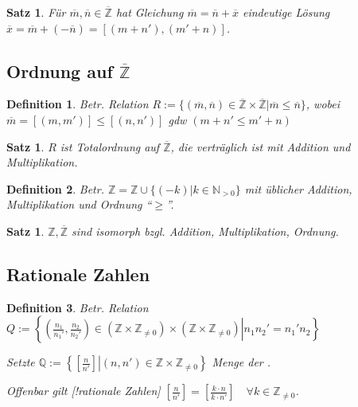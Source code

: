 \documentclass[ngerman,a4paper]{report}
\theoremstyle{break}
\newtheorem{satz}[theorem]{Satz}
\newtheorem*{definition}{Definition}
\begin{document}
\begin{satz}
	Für $\overline{m},\overline{n}\in\overline{\mathbb{Z}}$ hat Gleichung $\overline{m} = \overline{n} + \overline{x}$ eindeutige Lösung $\overline{x} = \overline{m} + (-\overline{n}) = [(m+n'),(m'+n)]$.
\end{satz}

\subsection*{Ordnung auf $\overline{\mathbb{Z}}$}
\begin{definition}
	Betr. Relation $R:=\{(\overline{m},\overline{n})\in\overline{\mathbb{Z}}\times\overline{\mathbb{Z}} | \overline{m} \le \overline{n}\}$, wobei $\overline{m} = [(m,m')] \le [(n,n')]$ \gls{gdw} $(m+n'\le m'+n)$
\end{definition}

\begin{satz}
	$R$ ist Totalordnung auf $\overline{\mathbb{Z}}$, die verträglich ist mit Addition und Multiplikation.
\end{satz}

\begin{definition}
	Betr. $\mathbb{Z} = \mathbb{Z}\cup\{ (-k) | k\in\mathbb{N}_{>0} \}$ mit üblicher Addition, Multiplikation und Ordnung "`$\ge$"'.
\end{definition}
\begin{satz}
	$\mathbb{Z},\overline{\mathbb{Z}}$ sind isomorph bzgl. Addition, Multiplikation, Ordnung.
\end{satz}

\subsection*{Rationale Zahlen}
\begin{definition}
	Betr. Relation $Q:=\left\lbrace \left. \left( \frac{n_1}{n_1'},\frac{n_2}{n_2'}\right) \in \left( \mathbb{Z}\times\mathbb{Z}_{\neq 0}\right)\times\left(\mathbb{Z}\times\mathbb{Z}_{\neq 0}\right) \right| n_1n_2' = n_1'n_2\right\rbrace$
	
	Setzte $\mathbb{Q} := \left\lbrace \left[ \left. \frac{n}{n'}\right] \right| (n,n')\in\mathbb{Z}\times\mathbb{Z}_{\neq 0}\right\rbrace$ Menge der .
	
	Offenbar gilt [!rationale Zahlen] $\left[ \frac{n}{n'}\right] = \left[ \frac{k\cdot n}{k\cdot n'}\right]\quad\forall k\in\mathbb{Z}_{\neq 0}$.
\end{definition}
\end{document}
